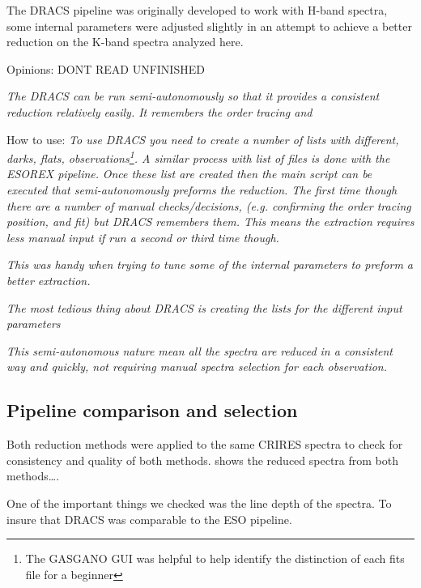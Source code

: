 The DRACS pipeline was originally developed to work with H-band spectra, some internal parameters were adjusted slightly in an attempt to achieve a better reduction on the K-band spectra analyzed here.


Opinions:
DONT READ UNFINISHED 

\textit{The DRACS can be run semi-autonomously so that it provides a consistent reduction relatively easily. It remembers the order tracing and}

How to use:
\textit{To use DRACS you need to create a number of lists with different, darks, flats, observations\footnote{The GASGANO GUI was helpful to help identify the distinction of each fits file for a beginner}. A similar process with list of files is done with the ESOREX pipeline.}
\textit{Once these list are created then the main script can be executed that semi-autonomously preforms the reduction. The first time though there are a number of manual checks/decisions, (e.g. confirming the order tracing position, and fit) but DRACS remembers them. This means the extraction requires less manual input if run a second or third time though.}

\textit{This was handy when trying to tune some of the internal parameters to preform a better extraction.}


\textit{The most tedious thing about DRACS is creating the lists for the different input parameters}

\textit{This semi-autonomous nature mean all the spectra are reduced in a consistent way and quickly, not requiring manual spectra selection for each observation.}


\subsection{Pipeline comparison and selection}

Both reduction methods were applied to the same CRIRES spectra to check for consistency and quality of both methods.  shows the reduced spectra from both methods\ldots.

One of the important things we checked was the line depth of the spectra. To insure that DRACS was comparable to the ESO pipeline.
\begin{figure}
   \label{fig:reductioncomparsion}
\end{figure}

